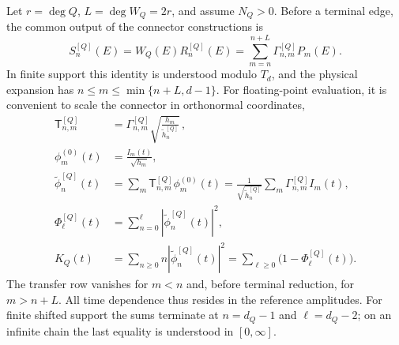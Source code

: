 \documentclass[a4paper,11pt]{article}
\theoremstyle{definition}
\theoremstyle{remark}
\newcommand{\tphi}{\widetilde\phi}
\newcommand{\thh}{\widetilde h}
\begin{document}
Let $r=\deg Q$, $L=\deg W_Q=2r$, and assume $N_Q>0$.  Before a terminal
edge, the common output of the connector constructions is
\begin{equation}
   S_n^{[Q]}(E)
   =W_Q(E)R_n^{[Q]}(E)
   =\sum_{m=n}^{n+L}\Gamma_{n,m}^{[Q]}P_m(E).
\end{equation}
In finite support this identity is understood modulo $T_d$, and the
physical expansion has $n\le m\le\min\{n+L,d-1\}$.  For floating-point
evaluation, it is convenient to scale the connector in orthonormal
coordinates, 
\begin{equation}
\begin{aligned}
   \mathsf T_{n,m}^{[Q]}
   &=
   \Gamma_{n,m}^{[Q]}
   \sqrt{\frac{h_m}{\thh_n^{[Q]}}}\,, \\
   \phi_m^{(0)}(t)&=\frac{I_m(t)}{\sqrt{h_m}},\\
   \tphi_n^{[Q]}(t)
   &=
   \sum_m\mathsf T_{n,m}^{[Q]}\phi_m^{(0)}(t)
   =
   \frac{1}{\sqrt{\thh_n^{[Q]}}}
   \sum_m\Gamma_{n,m}^{[Q]}I_m(t),\\
   \Phi_\ell^{[Q]}(t)
   &=\sum_{n=0}^{\ell}|\tphi_n^{[Q]}(t)|^2,\\
   K_Q(t)
   &=\sum_{n\ge0}n|\tphi_n^{[Q]}(t)|^2
   =\sum_{\ell\ge0}\bigl(1-\Phi_\ell^{[Q]}(t)\bigr).
\end{aligned}
   \label{eq:numerical-amplitude-complexity-app}
\end{equation}
The transfer row vanishes for $m<n$ and, before terminal reduction, for
$m>n+L$.  All time dependence thus resides in the reference amplitudes.  For finite shifted support the sums
terminate at $n=d_Q-1$ and $\ell=d_Q-2$; on an infinite chain the last
equality is understood in $[0,\infty]$.
\end{document}
